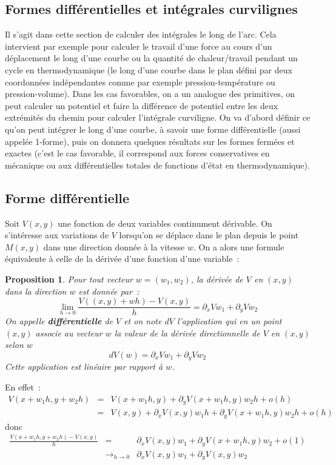 \documentclass[a4paper,11pt]{article}
\newtheorem{prop}[thm]{Proposition}
\begin{document}
\begin{giacjshere}
\section{Formes diff\'erentielles et int\'egrales curvilignes} 
\label{sec:diff}
Il s'agit dans cette section de calculer des int\'egrales
le long de l'arc. Cela intervient
par exemple pour calculer le travail d'une force au cours d'un
d\'eplacement le long d'une courbe 
ou la quantit\'e de chaleur/travail pendant
un cycle en thermodynamique (le long d'une courbe
dans le plan d\'efini par deux coordonn\'ees ind\'ependantes 
comme par exemple pression-temp\'erature ou pression-volume). 
Dans les cas favorables, on a un analogue des primitives, on peut
calculer un potentiel et faire la diff\'erence de potentiel entre les
deux extr\'emit\'es du chemin pour calculer l'int\'egrale curviligne.
On va d'abord d\'efinir ce
qu'on peut int\'egrer le long d'une courbe, \`a savoir une
forme diff\'erentielle (aussi appel\'ee 1-forme), puis on
donnera quelques r\'esultats sur les formes ferm\'ees et
exactes (c'est le cas favorable, il correspond aux forces
conservatives en m\'ecanique ou aux diff\'erentielles totales
de fonctions d'\'etat en thermodynamique).

\subsection{Forme diff\'erentielle}
Soit $V(x,y)$ une fonction de deux variables continument d\'erivable.
On s'int\'eresse aux variations de $V$ lorsqu'on se d\'eplace dans le
plan depuis le point $M(x,y)$ dans une direction donn\'ee \`a
la vitesse $w$.
On a alors une formule \'equivalente \`a celle de 
la d\'eriv\'ee d'une fonction d'une variable~:
\begin{prop}
Pour tout vecteur $w=(w_1,w_2)$, la d\'eriv\'ee de $V$ en $(x,y)$
dans la direction $w$ est donn\'ee par~:
$$ \lim_{h\rightarrow 0} \frac{V((x,y)+wh)-V(x,y)}{h}=
\partial_xVw_1+\partial_yV w_2$$
On appelle {\bf diff\'erentielle} 
de $V$ et on note $dV$ l'application
qui en un point $(x,y)$ associe au vecteur $w$ la valeur de la
d\'eriv\'ee directionnelle de $V$ en $(x,y)$ selon $w$
$$ dV(w)=\partial_xV w_1+\partial_yV w_2$$
Cette application est lin\'eaire par rapport \`a $w$.
\end{prop}
En effet~:
\begin{eqnarray*}
 V(x+w_1h,y+w_2h)&=&V(x+w_1h,y)+\partial_yV(x+w_1h,y) w_2h + o(h)\\
&=&V(x,y)+\partial_xV(x,y) w_1 h + \partial_yV(x+w_1h,y) w_2h + o(h)
\end{eqnarray*}
donc
\begin{eqnarray*}
 \frac{V(x+w_1h,y+w_2h)-V(x,y)}{h} & = &
\partial_xV(x,y) w_1 + \partial_yV(x+w_1h,y) w_2 +o(1) \\
&\rightarrow_{h\rightarrow 0} & \partial_xV(x,y) w_1
+ \partial_yV(x,y) w_2 
\end{eqnarray*}


\end{giacjshere}
\end{document}
